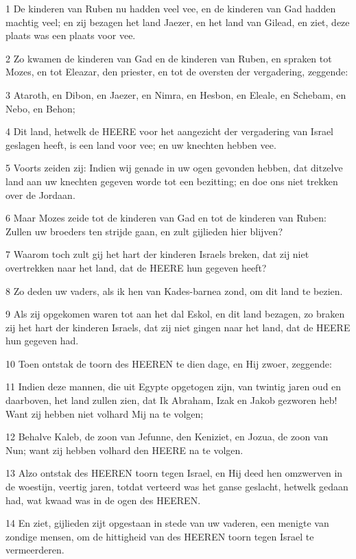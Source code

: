 \par 1 De kinderen van Ruben nu hadden veel vee, en de kinderen van Gad hadden machtig veel; en zij bezagen het land Jaezer, en het land van Gilead, en ziet, deze plaats was een plaats voor vee.
\par 2 Zo kwamen de kinderen van Gad en de kinderen van Ruben, en spraken tot Mozes, en tot Eleazar, den priester, en tot de oversten der vergadering, zeggende:
\par 3 Ataroth, en Dibon, en Jaezer, en Nimra, en Hesbon, en Eleale, en Schebam, en Nebo, en Behon;
\par 4 Dit land, hetwelk de HEERE voor het aangezicht der vergadering van Israel geslagen heeft, is een land voor vee; en uw knechten hebben vee.
\par 5 Voorts zeiden zij: Indien wij genade in uw ogen gevonden hebben, dat ditzelve land aan uw knechten gegeven worde tot een bezitting; en doe ons niet trekken over de Jordaan.
\par 6 Maar Mozes zeide tot de kinderen van Gad en tot de kinderen van Ruben: Zullen uw broeders ten strijde gaan, en zult gijlieden hier blijven?
\par 7 Waarom toch zult gij het hart der kinderen Israels breken, dat zij niet overtrekken naar het land, dat de HEERE hun gegeven heeft?
\par 8 Zo deden uw vaders, als ik hen van Kades-barnea zond, om dit land te bezien.
\par 9 Als zij opgekomen waren tot aan het dal Eskol, en dit land bezagen, zo braken zij het hart der kinderen Israels, dat zij niet gingen naar het land, dat de HEERE hun gegeven had.
\par 10 Toen ontstak de toorn des HEEREN te dien dage, en Hij zwoer, zeggende:
\par 11 Indien deze mannen, die uit Egypte opgetogen zijn, van twintig jaren oud en daarboven, het land zullen zien, dat Ik Abraham, Izak en Jakob gezworen heb! Want zij hebben niet volhard Mij na te volgen;
\par 12 Behalve Kaleb, de zoon van Jefunne, den Keniziet, en Jozua, de zoon van Nun; want zij hebben volhard den HEERE na te volgen.
\par 13 Alzo ontstak des HEEREN toorn tegen Israel, en Hij deed hen omzwerven in de woestijn, veertig jaren, totdat verteerd was het ganse geslacht, hetwelk gedaan had, wat kwaad was in de ogen des HEEREN.
\par 14 En ziet, gijlieden zijt opgestaan in stede van uw vaderen, een menigte van zondige mensen, om de hittigheid van des HEEREN toorn tegen Israel te vermeerderen.
